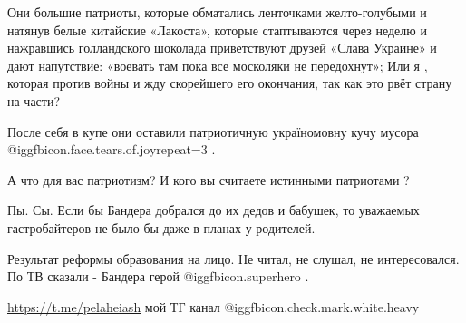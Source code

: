 Они большие патриоты, которые обматались ленточками желто-голубыми и натянув
белые китайские «Лакоста», которые стаптываются через неделю и нажравшись
голландского шоколада приветствуют друзей «Слава Украине» и дают напутствие:
«воевать там пока все москоляки не передохнут»; Или я , которая против войны и
жду скорейшего его окончания, так как это рвёт страну на части?

После себя в купе они оставили патриотичную україномовну кучу  мусора
@igg{fbicon.face.tears.of.joy}{repeat=3} .

А что для вас патриотизм? И кого вы считаете истинными патриотами ?

Пы. Сы. Если бы Бандера добрался до их дедов и бабушек, то уважаемых
гастробайтеров не было бы даже в планах у родителей.

Результат реформы образования на лицо. Не читал, не слушал, не интересовался.
По ТВ сказали - Бандера герой  @igg{fbicon.superhero} .

\url{https://t.me/pelaheiash} мой ТГ канал  @igg{fbicon.check.mark.white.heavy} 

